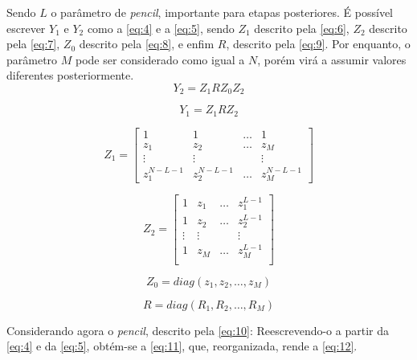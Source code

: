 \documentclass[12pt]{article}
\begin{document}
Sendo $L$ o parâmetro de \textit{pencil}, importante para etapas posteriores. É possível escrever $Y_1$ e $Y_2$ como a \autoref{eq:4} e a \autoref{eq:5}, sendo $Z_1$ descrito pela \autoref{eq:6}, $Z_2$ descrito pela \autoref{eq:7}, $Z_0$ 
descrito pela \autoref{eq:8}, e enfim $R$, descrito pela \autoref{eq:9}. Por enquanto, o parâmetro $M$ pode ser considerado como igual a $N$, porém virá a assumir valores diferentes posteriormente.
\begin{equation} \label{eq:4}
    Y_2 = Z_1 R Z_0 Z_2
\end{equation}

\begin{equation} \label{eq:5}
    Y_1 = Z_1 R Z_2
\end{equation}

\begin{equation} \label{eq:6}
    Z_1 = \begin{bmatrix} 1 & 1 & \dots & 1 \\
                            z_1 & z_2 & \dots & z_M \\
                            \vdots & \vdots & & \vdots \\
                            z_1^{N - L - 1} & z_2^{N - L - 1} & \dots & z_M^{N - L - 1} 
    \end{bmatrix}  
\end{equation}

\begin{equation} \label{eq:7}
    Z_2 = \begin{bmatrix} 1 & z_1 & \dots & z_1^{L-1} \\
                            1 & z_2 & \dots & z_2^{L-1} \\
                            \vdots & \vdots & & \vdots \\
                            1 & z_M & \dots & z_M^{L-1} \\
    \end{bmatrix}
\end{equation}

\begin{equation} \label{eq:8}
    Z_0 = diag(z_1, z_2, \dots, z_M)
\end{equation}

\begin{equation} \label{eq:9}
    R = diag(R_1, R_2, \dots, R_M)
\end{equation}

Considerando agora o \textit{pencil}, descrito pela \autoref{eq:10}: Reescrevendo-o a partir da \autoref{eq:4} e da \autoref{eq:5}, obtém-se a \autoref{eq:11}, que, reorganizada, 
rende a \autoref{eq:12}.
\end{document}
